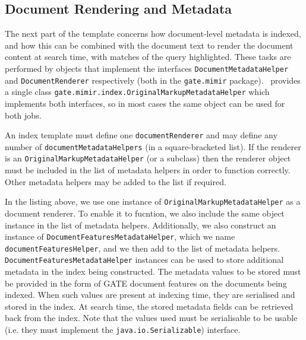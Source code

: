 \subsection*{Document Rendering and Metadata}

The next part of the template concerns how document-level metadata is indexed,
and how this can be combined with the document text to render the document
content at search time, with matches of the query highlighted.  These tasks are
performed by objects that implement the interfaces
\lstinline!DocumentMetadataHelper! and \lstinline!DocumentRenderer!
respectively (both in the \lstinline!gate.mimir! package). \Mimir\ provides a
single class \lstinline!gate.mimir.index.OriginalMarkupMetadataHelper!
which implements both interfaces, so in most cases the same object can be used
for both jobs.

An index template must define one \lstinline!documentRenderer! and may define
any number of \lstinline!documentMetadataHelpers! (in a square-bracketed list).
If the renderer is an \lstinline!OriginalMarkupMetadataHelper! (or a subclass)
then the renderer object must be included in the list of metadata helpers in
order to function correctly.  Other metadata helpers may be added to the list
if required.

In the listing above, we use one instance of
\lstinline!OriginalMarkupMetadataHelper! as a document renderer. To enable it to
fucntion, we also include the same object instance in the list of metadata
helpers. Additionally, we also construct an instance of
\lstinline!DocumentFeaturesMetadataHelper!, which we name
\lstinline!documentFeaturesHelper!, and we then add to the list of metadata
helpers. \lstinline!DocumentFeaturesMetadataHelper! instances can be used to
store additional metadata in the index being constructed. The metadata values to
be stored must be provided in the form of GATE document features on the
documents being indexed. When such values are present at indexing time, they are
serialised and stored in the index. At search time, the stored metadata fields
can be retrieved back from the index. Note that the values used must be
serialisable to be usable (i.e. they must implement the 
\lstinline!java.io.Serializable!) interface. 


